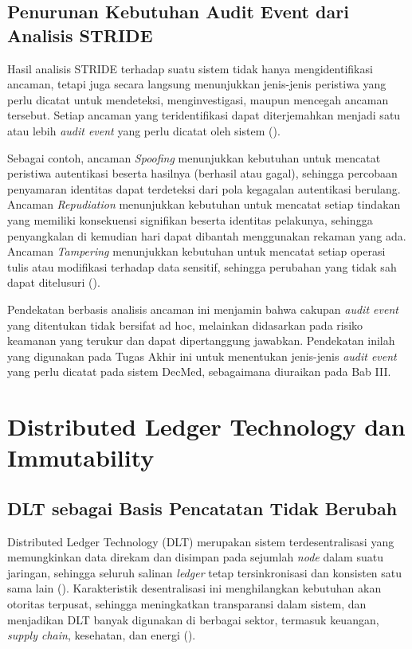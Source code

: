 \subsection{Penurunan Kebutuhan Audit Event dari Analisis STRIDE}
\label{subsec:penurunan-audit-event}

Hasil analisis STRIDE terhadap suatu sistem tidak hanya mengidentifikasi
ancaman, tetapi juga secara langsung menunjukkan jenis-jenis peristiwa
yang perlu dicatat untuk mendeteksi, menginvestigasi, maupun mencegah
ancaman tersebut. Setiap ancaman yang teridentifikasi dapat diterjemahkan
menjadi satu atau lebih \textit{audit event} yang perlu dicatat oleh
sistem (\cite{laksono2021stride}).

Sebagai contoh, ancaman \textit{Spoofing} menunjukkan kebutuhan untuk
mencatat peristiwa autentikasi beserta hasilnya (berhasil atau gagal),
sehingga percobaan penyamaran identitas dapat terdeteksi dari pola
kegagalan autentikasi berulang. Ancaman \textit{Repudiation} menunjukkan
kebutuhan untuk mencatat setiap tindakan yang memiliki konsekuensi
signifikan beserta identitas pelakunya, sehingga penyangkalan di kemudian
hari dapat dibantah menggunakan rekaman yang ada. Ancaman
\textit{Tampering} menunjukkan kebutuhan untuk mencatat setiap operasi
tulis atau modifikasi terhadap data sensitif, sehingga perubahan yang
tidak sah dapat ditelusuri (\cite{laksono2021stride}).

Pendekatan berbasis analisis ancaman ini menjamin bahwa cakupan
\textit{audit event} yang ditentukan tidak bersifat ad hoc, melainkan
didasarkan pada risiko keamanan yang terukur dan dapat dipertanggung
jawabkan. Pendekatan inilah yang digunakan pada Tugas Akhir ini untuk
menentukan jenis-jenis \textit{audit event} yang perlu dicatat pada
sistem DecMed, sebagaimana diuraikan pada Bab III.


\section{Distributed Ledger Technology dan Immutability}
\label{sec:dlt}

\subsection{DLT sebagai Basis Pencatatan Tidak Berubah}
\label{subsec:dlt-umum}

Distributed Ledger Technology (DLT) merupakan sistem terdesentralisasi
yang memungkinkan data direkam dan disimpan pada sejumlah \textit{node}
dalam suatu jaringan, sehingga seluruh salinan \textit{ledger} tetap
tersinkronisasi dan konsisten satu sama lain (\cite{DecMed}).
Karakteristik desentralisasi ini menghilangkan kebutuhan akan otoritas
terpusat, sehingga meningkatkan transparansi dalam sistem, dan
menjadikan DLT banyak digunakan di berbagai sektor, termasuk keuangan,
\textit{supply chain}, kesehatan, dan energi (\cite{DecMed}).

